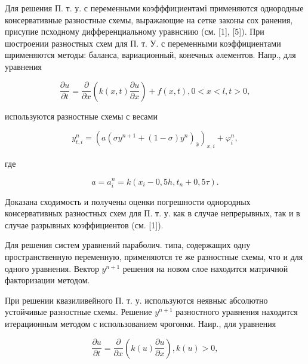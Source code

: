 \documentclass[10pt]{article}
\begin{document}
Для решения П. т. у. с переменными коэфффициентамі применяются однородные консервативные разностные схемы, выражающие на сетке законы сох ранения, присупие псходному дифференциальному уравнснию (см. [1], [5]). При шостроении разностных схем для П. т. У. с переменными коэффициентами шрименяются методы: баланса, вариационный, конечных әлементов. Напр., для уравнения



\[

\frac{\partial u}{\partial t}=\frac{\partial}{\partial x}\left(k(x, t) \frac{\partial u}{\partial x}\right)+f(x, t), 0<x<l, t>0,

\]



используются разностные схемы с весами



\[

y_{t, i}^{n}=\left(a\left(\sigma y^{n+1}+(1-\sigma) y^{n}\right)_{\bar{x}}\right)_{x, i}+\varphi_{i}^{n},

\]



где



\[

a=a_{i}^{n}=k\left(x_{i}-0,5 h, t_{n}+0,5 \tau\right) .

\]



Доказана сходимость и получены оценки погрешности однородных консервативных разностных схем для П. т. у. как в случае непрерывных, так и в случае разрывных коэффициентов (см. [1]).



Для решения систем уравнений параболич. типа, содержащих одну пространственную переменную, применяются те же разностные схемы, что и для одного уравнения. Вектор $y^{n+1}$ решения на новом слое находится матричной факторизации методом.



При решении квазиливейного П. т. у. используются неявныс абсолютно устойчивые разностные схемы. Решение $y^{n+1}$ разностного уравнения находится итерационным методом с использованием чрогонки. Наир., для уравнения



\[

\frac{\partial u}{\partial t}=\frac{\partial}{\partial x}\left(k(u) \frac{\partial u}{\partial x}\right), k(u)>0,

\]
\end{document}
